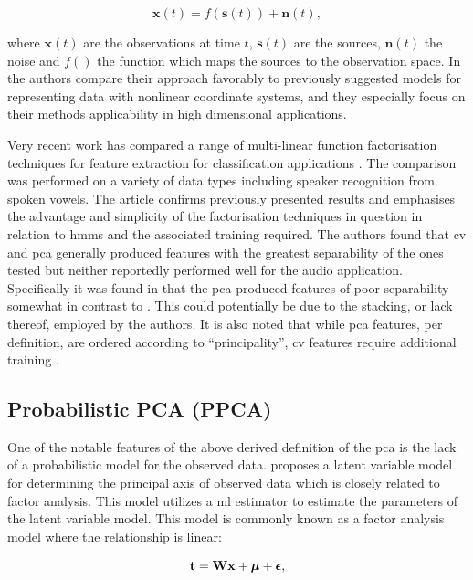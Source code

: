 \begin{equation}\label{eq:nonlinear}
\textbf{x}(t) = f\left(\textbf{s}(t)\right) + \textbf{n}\left(t\right),
\end{equation}

where $\textbf{x}(t)$ are the observations at time $t$, $\textbf{s}(t)$ are the sources, $\textbf{n}(t)$ the noise and $f()$ the function which maps the sources to the observation space. In \cite{Lappalainen2000} the authors compare their approach favorably to previously suggested models for representing data with nonlinear coordinate systems, and they especially focus on their methods applicability in high dimensional applications.

Very recent work has compared a range of multi-linear function factorisation techniques for feature extraction for classification applications \cite{Burke2013}. The comparison was performed on a variety of data types including speaker recognition from spoken vowels. The article confirms previously presented results and emphasises the advantage and simplicity of the factorisation techniques in question in relation to \gls{hmm}s and the associated training required. The authors found that \gls{cv} and \gls{pca} generally produced features with the greatest separability of the ones tested but neither reportedly performed well for the audio application. Specifically it was found in \cite{Burke2013} that the \gls{pca} produced features of poor separability somewhat in contrast to \cite{Raychaudhuri2000}. This could potentially be due to the stacking, or lack thereof, employed by the authors. It is also noted that while \gls{pca} features, per definition, are ordered according to ``principality'', \gls{cv} features require additional training \cite{Burke2013}.

\subsection{Probabilistic PCA (PPCA)}
One of the notable features of the above derived definition of the \gls{pca} is the lack of a probabilistic model for the observed data. \cite{Tipping1999} proposes a latent variable model for determining the principal axis of observed data which is closely related to factor analysis. This model utilizes a \gls{ml} estimator to estimate the parameters of the latent variable model. This model is commonly known as a factor analysis model where the relationship is linear:

\begin{equation}\label{eq:facAn}
\textrm{\textbf{t}} = \textrm{\textbf{W}}\textrm{\textbf{x}} + \boldsymbol\mu + \boldsymbol\epsilon,
\end{equation}

